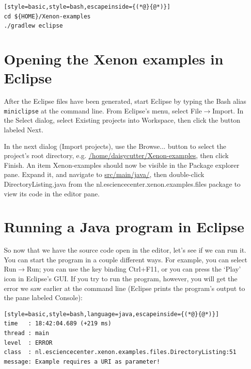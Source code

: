 \documentclass[12pt, a4paper, twoside, openany, titlepage]{book}
\begin{document}
\begin{lstlisting}[style=basic,style=bash,escapeinside={(*@}{@*)}]
cd ${HOME}/Xenon-examples
./gradlew eclipse
\end{lstlisting} %

\section{Opening the Xenon examples in Eclipse}

After the Eclipse files have been generated, start Eclipse by typing the Bash alias \texttt{miniclipse} at the command line. From Eclipse's menu, select \textsf{File}$\rightarrow$\textsf{Import}. In the \textsf{Select} dialog, select \textsf{Existing projects into Workspace}, then click the button labeled \textsf{Next}.

In the next dialog (\textsf{Import projects}), use the \textsf{Browse...} button to select the project's root directory, e.g. \url{/home/daisycutter/Xenon-examples}, then click \textsf{Finish}. An item \textsf{Xenon-examples} should now be visible in the \textsf{Package explorer} pane. Expand it, and navigate to \url{src/main/java/}, then double-click \textsf{DirectoryListing.java} from the \textsf{nl.esciencecenter.xenon.examples.files} package to view its code in the editor pane.




\section{Running a Java program in Eclipse}


So now that we have the source code open in the editor, let's see if we can run it. You can start the program in a couple different ways. For example, you can select \textsf{Run}$\rightarrow$\textsf{Run}; you can use the key binding \textsf{Ctrl+F11}, or you can press the `Play' icon in Eclipse's GUI. If you try to run the program, however, you will get the error we saw earlier at the command line (Eclipse prints the program's output to the pane labeled \textsf{Console}):
\begin{lstlisting}[style=basic,style=bash,language=java,escapeinside={(*@}{@*)}]
time   : 18:42:04.689 (+219 ms)
thread : main
level  : ERROR
class  : nl.esciencecenter.xenon.examples.files.DirectoryListing:51
message: Example requires a URI as parameter!
\end{lstlisting}
\end{document}
